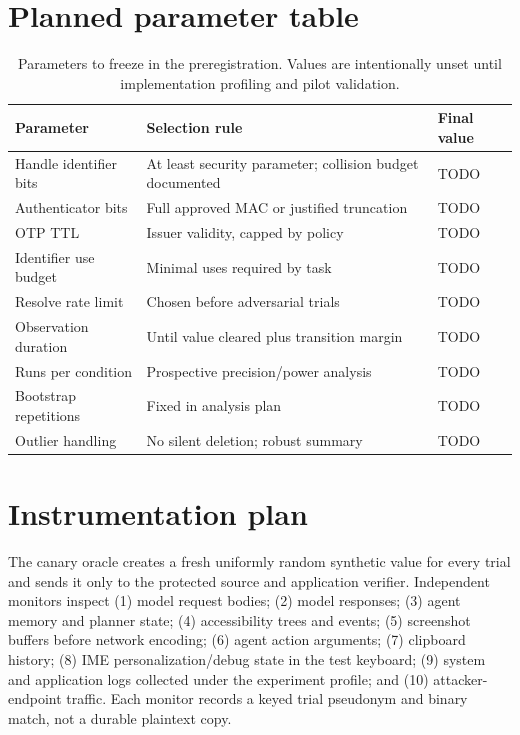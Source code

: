 \section{Planned parameter table}

\begin{table}[h]
\centering
\caption{Parameters to freeze in the preregistration. Values are intentionally unset until implementation profiling and pilot validation.}
\begin{tabularx}{\textwidth}{@{}lXl@{}}
\toprule
Parameter & Selection rule & Final value \\
\midrule
Handle identifier bits & At least security parameter; collision budget documented & TODO \\
Authenticator bits & Full approved MAC or justified truncation & TODO \\
OTP TTL & Issuer validity, capped by policy & TODO \\
Identifier use budget & Minimal uses required by task & TODO \\
Resolve rate limit & Chosen before adversarial trials & TODO \\
Observation duration & Until value cleared plus transition margin & TODO \\
Runs per condition & Prospective precision/power analysis & TODO \\
Bootstrap repetitions & Fixed in analysis plan & TODO \\
Outlier handling & No silent deletion; robust summary & TODO \\
\bottomrule
\end{tabularx}
\end{table}

\section{Instrumentation plan}

The canary oracle creates a fresh uniformly random synthetic value for every trial and sends it only to the protected source and application verifier. Independent monitors inspect (1) model request bodies; (2) model responses; (3) agent memory and planner state; (4) accessibility trees and events; (5) screenshot buffers before network encoding; (6) agent action arguments; (7) clipboard history; (8) IME personalization/debug state in the test keyboard; (9) system and application logs collected under the experiment profile; and (10) attacker-endpoint traffic. Each monitor records a keyed trial pseudonym and binary match, not a durable plaintext copy.

